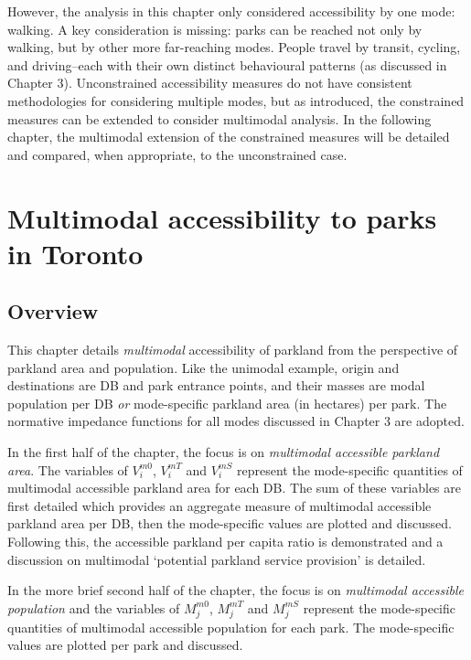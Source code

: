 \documentclass[
11pt, %
oneside, %
english, %
singlespacing, %
]{macthesis} %
\begin{document}
However, the analysis in this chapter only considered accessibility by one mode: walking. A key consideration is missing: parks can be reached not only by walking, but by other more far-reaching modes. People travel by transit, cycling, and driving--each with their own distinct behavioural patterns (as discussed in Chapter 3). Unconstrained accessibility measures do not have consistent methodologies for considering multiple modes, but as introduced, the constrained measures can be extended to consider multimodal analysis. In the following chapter, the multimodal extension of the constrained measures will be detailed and compared, when appropriate, to the unconstrained case.

\chapter{Multimodal accessibility to parks in Toronto}\label{multimodal-accessibility-to-parks-in-toronto}

\section{Overview}\label{overview-5}

This chapter details \emph{multimodal} accessibility of parkland from the perspective of parkland area and population. Like the unimodal example, origin and destinations are DB and park entrance points, and their masses are modal population per DB \emph{or} mode-specific parkland area (in hectares) per park. The normative impedance functions for all modes discussed in Chapter 3 are adopted.

In the first half of the chapter, the focus is on \emph{multimodal accessible parkland area}. The variables of \(V^{m0}_i\), \(V^{mT}_i\) and \(V^{mS}_i\) represent the mode-specific quantities of multimodal accessible parkland area for each DB. The sum of these variables are first detailed which provides an aggregate measure of multimodal accessible parkland area per DB, then the mode-specific values are plotted and discussed. Following this, the accessible parkland per capita ratio is demonstrated and a discussion on multimodal `potential parkland service provision' is detailed.

In the more brief second half of the chapter, the focus is on \emph{multimodal accessible population} and the variables of \(M^{m0}_j\), \(M^{mT}_j\) and \(M^{mS}_j\) represent the mode-specific quantities of multimodal accessible population for each park. The mode-specific values are plotted per park and discussed.
\end{document}
